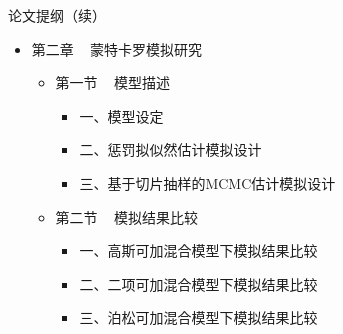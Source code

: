 \documentclass[ignorenonframetext,11pt,xcolor=dvipsnames,aspectratio=1610,hyperref={bookmarksdepth=4}]{beamer}
\providecommand{\tightlist}{%
  \setlength{\itemsep}{0pt}\setlength{\parskip}{0pt}}
\begin{document}
\begin{frame}{论文提纲（续）}

\begin{itemize}
\tightlist
\item
  第二章 ~ 蒙特卡罗模拟研究

  \begin{itemize}
  \tightlist
  \item
    第一节 ~ 模型描述

    \begin{itemize}
    \tightlist
    \item
      一、模型设定
    \item
      二、惩罚拟似然估计模拟设计
    \item
      三、基于切片抽样的MCMC估计模拟设计
    \end{itemize}
  \item
    第二节 ~ 模拟结果比较

    \begin{itemize}
    \tightlist
    \item
      一、高斯可加混合模型下模拟结果比较
    \item
      二、二项可加混合模型下模拟结果比较
    \item
      三、泊松可加混合模型下模拟结果比较
    \end{itemize}
  \end{itemize}
\end{itemize}

\end{frame}
\end{document}
